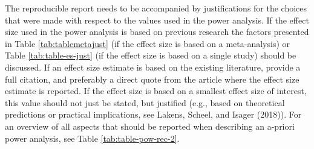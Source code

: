 \documentclass[
  english,
  ,jou,floatsintext]{apa6}
\begin{document}
The reproducible report needs to be accompanied by justifications for the choices that were made with respect to the values used in the power analysis. If the effect size used in the power analysis is based on previous research the factors presented in Table \ref{tab:tablemetajust} (if the effect size is based on a meta-analysis) or Table \ref{tab:table-es-just} (if the effect size is based on a single study) should be discussed. If an effect size estimate is based on the existing literature, provide a full citation, and preferably a direct quote from the article where the effect size estimate is reported. If the effect size is based on a smallest effect size of interest, this value should not just be stated, but justified (e.g., based on theoretical predictions or practical implications, see Lakens, Scheel, and Isager (2018)). For an overview of all aspects that should be reported when describing an a-priori power analysis, see Table \ref{tab:table-pow-rec-2}.
\end{document}
